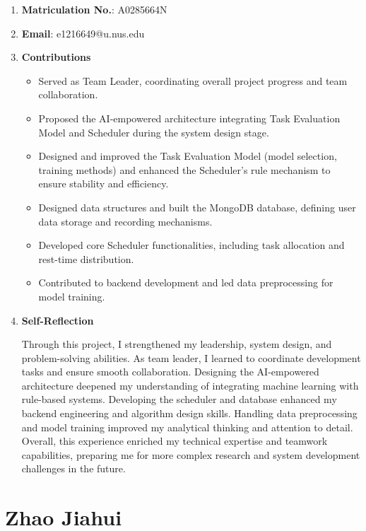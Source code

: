 \documentclass[12pt, a4paper]{article}
\begin{document}
    \begin{enumerate}
        \item \textbf{Matriculation No.}: A0285664N
        \item \textbf{Email}: e1216649@u.nus.edu
        \item \textbf{Contributions}

            \begin{itemize}
                \item Served as Team Leader, coordinating overall project progress and team collaboration.
                \item Proposed the AI-empowered architecture integrating Task Evaluation Model and Scheduler during the system design stage.
                \item Designed and improved the Task Evaluation Model (model selection, training methods) and enhanced the Scheduler’s rule mechanism to ensure stability and efficiency.
                \item Designed data structures and built the MongoDB database, defining user data storage and recording mechanisms.
                \item Developed core Scheduler functionalities, including task allocation and rest-time distribution.
                \item Contributed to backend development and led data preprocessing for model training.
            \end{itemize}
        
        \item \textbf{Self-Reflection}

            Through this project, I strengthened my leadership, system design, and problem-solving abilities. As team leader, I learned to coordinate development tasks and ensure smooth collaboration. Designing the AI-empowered architecture deepened my understanding of integrating machine learning with rule-based systems. Developing the scheduler and database enhanced my backend engineering and algorithm design skills. Handling data preprocessing and model training improved my analytical thinking and attention to detail. Overall, this experience enriched my technical expertise and teamwork capabilities, preparing me for more complex research and system development challenges in the future.
         
    \end{enumerate}

    

\section{Zhao Jiahui} 
\end{document}
